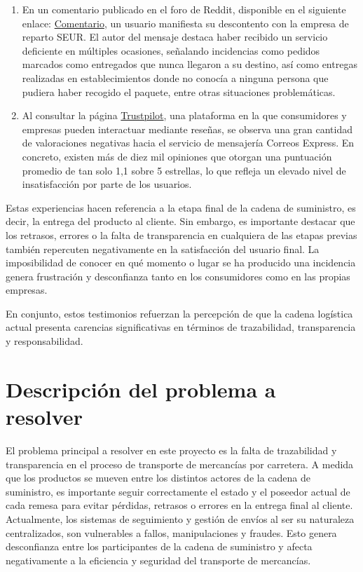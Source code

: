 \begin{enumerate}
    \item En un comentario publicado en el foro de Reddit, disponible en el siguiente enlace: \href{https://www.reddit.com/r/es/comments/1an0c3x/seur_es_una_mierda/?tl=es-es}{Comentario}, un usuario manifiesta su descontento con la empresa de reparto SEUR. El autor del mensaje destaca haber recibido un servicio deficiente en múltiples ocasiones, señalando incidencias como pedidos marcados como entregados que nunca llegaron a su destino, así como entregas realizadas en establecimientos donde no conocía a ninguna persona que pudiera haber recogido el paquete, entre otras situaciones problemáticas.
    \item Al consultar la página \href{https://es.trustpilot.com}{Trustpilot}, una plataforma en la que consumidores y empresas pueden interactuar mediante reseñas, se observa una gran cantidad de valoraciones negativas hacia el servicio de mensajería Correos Express. En concreto, existen más de diez mil opiniones que otorgan una puntuación promedio de tan solo 1,1 sobre 5 estrellas, lo que refleja un elevado nivel de insatisfacción por parte de los usuarios.
\end{enumerate}

Estas experiencias hacen referencia a la etapa final de la cadena de suministro, es decir, la entrega del producto al cliente. Sin embargo, es importante destacar que los retrasos, errores o la falta de transparencia en cualquiera de las etapas previas también repercuten negativamente en la satisfacción del usuario final. La imposibilidad de conocer en qué momento o lugar se ha producido una incidencia genera frustración y desconfianza tanto en los consumidores como en las propias empresas.

En conjunto, estos testimonios refuerzan la percepción de que la cadena logística actual presenta carencias significativas en términos de trazabilidad, transparencia y responsabilidad.


\section{Descripción del problema a resolver}
El problema principal a resolver en este proyecto es la falta de trazabilidad y transparencia en el proceso de transporte de mercancías por carretera. A medida que los productos se mueven entre los distintos
actores de la cadena de suministro, es importante seguir correctamente el estado y el poseedor actual de cada remesa para evitar pérdidas, retrasos o errores en la entrega final al cliente.
Actualmente, los sistemas de seguimiento y gestión de envíos al ser su naturaleza centralizados, son vulnerables a fallos, manipulaciones y fraudes. Esto genera desconfianza entre los participantes de la cadena de suministro y
afecta negativamente a la eficiencia y seguridad del transporte de mercancías. \\







    
    
    